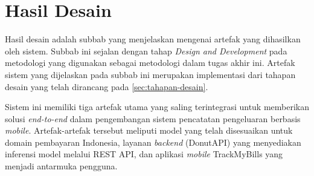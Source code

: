 \section{Hasil Desain}
\label{sec:hasil-desain}

Hasil desain adalah subbab yang menjelaskan mengenai artefak yang dihasilkan oleh sistem. Subbab ini sejalan dengan tahap \emph{Design and Development} pada metodologi \dsrm{} yang digunakan sebagai metodologi dalam tugas akhir ini. Artefak sistem yang dijelaskan pada subbab ini merupakan implementasi dari tahapan desain yang telah dirancang pada \autoref{sec:tahapan-desain}. 

Sistem ini memiliki tiga artefak utama yang saling terintegrasi untuk memberikan solusi \emph{end-to-end} dalam pengembangan sistem pencatatan pengeluaran berbasis \emph{mobile}. Artefak-artefak tersebut meliputi model \donut{} yang telah disesuaikan untuk domain pembayaran Indonesia, layanan \emph{backend} (DonutAPI) yang menyediakan inferensi model melalui REST API, dan aplikasi \emph{mobile} TrackMyBills yang menjadi antarmuka pengguna.







% 